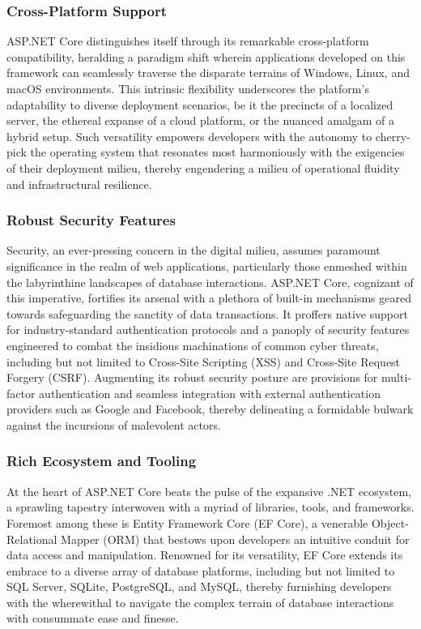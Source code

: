 \subsubsection{Cross-Platform Support}
ASP.NET Core distinguishes itself through its remarkable cross-platform
compatibility, heralding a paradigm shift wherein applications developed on this
framework can seamlessly traverse the disparate terrains of Windows, Linux, and
macOS environments. This intrinsic flexibility underscores the platform's
adaptability to diverse deployment scenarios, be it the precincts of a localized
server, the ethereal expanse of a cloud platform, or the nuanced amalgam of a
hybrid setup. Such versatility empowers developers with the autonomy to
cherry-pick the operating system that resonates most harmoniously with the
exigencies of their deployment milieu, thereby engendering a milieu of
operational fluidity and infrastructural resilience.

\subsubsection{Robust Security Features}
Security, an ever-pressing concern in the digital milieu, assumes paramount
significance in the realm of web applications, particularly those enmeshed
within the labyrinthine landscapes of database interactions. ASP.NET Core,
cognizant of this imperative, fortifies its arsenal with a plethora of built-in
mechanisms geared towards safeguarding the sanctity of data transactions. It
proffers native support for industry-standard authentication protocols and a
panoply of security features engineered to combat the insidious machinations of
common cyber threats, including but not limited to Cross-Site Scripting (XSS)
and Cross-Site Request Forgery (CSRF). Augmenting its robust security posture
are provisions for multi-factor authentication and seamless integration with
external authentication providers such as Google and Facebook, thereby
delineating a formidable bulwark against the incursions of malevolent actors.

\subsubsection{Rich Ecosystem and Tooling}
At the heart of ASP.NET Core beats the pulse of the expansive .NET ecosystem, a
sprawling tapestry interwoven with a myriad of libraries, tools, and frameworks.
Foremost among these is Entity Framework Core (EF Core), a venerable
Object-Relational Mapper (ORM) that bestows upon developers an intuitive conduit
for data access and manipulation. Renowned for its versatility, EF Core extends
its embrace to a diverse array of database platforms, including but not limited
to SQL Server, SQLite, PostgreSQL, and MySQL, thereby furnishing developers with
the wherewithal to navigate the complex terrain of database interactions with
consummate ease and finesse.

